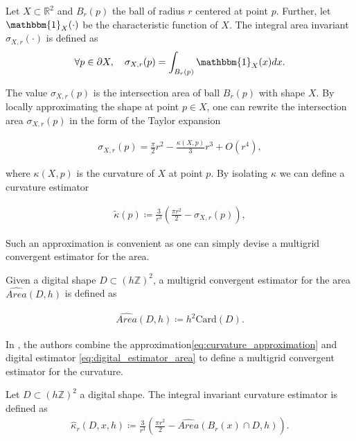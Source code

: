 \documentclass[runningheads]{llncs}
\begin{document}
\begin{definition}
  Let $X \subset \mathbb{R}^2$ and $B_r(p)$ the ball of radius $r$ centered at point $p$. Further, let
  $\mathbbm{1}_X(\cdot)$ be the characteristic function of $X$. The integral area invariant $\sigma_{X,r}(\cdot)$ is
  defined as
  \begin{align*}
    \forall p \in \partial X, \quad \sigma_{X,r}(p) = \int_{B_r(p)}{ \mathbbm{1}_X(x) dx}.
  \end{align*}
\end{definition}


The value $\sigma_{X,r}(p)$ is the intersection area of ball $B_r(p)$ with shape $X$. By locally approximating the shape
at point $p \in X$, one can rewrite the intersection area $\sigma_{X,r}(p)$ in the form of the Taylor expansion
\cite{pottman09intinvariant}
	
\begin{align*}
  \sigma_{X,r}(p) = \frac{\pi}{2}r^2 - \frac{\kappa(X,p)}{3}r^3 + O(r^4),
\end{align*}
		
where $\kappa(X,p)$ is the curvature of $X$ at point $p$. By isolating $\kappa$ we can define a curvature estimator
	
\begin{align}
  \tilde{\kappa}(p) \coloneqq \frac{3}{r^3}\left( \frac{\pi r^2}{2} - \sigma_{X,r}(p) \right),
  \label{eq:curvature_approximation}
\end{align}
	
Such an approximation is convenient as one can simply devise a multigrid convergent estimator for the area.

\begin{definition}	
  Given a digital shape $D \subset (h \mathbb{Z})^2$, a multigrid convergent estimator for the area $\widehat{Area}(D,h)$ is defined as	
		
  \begin{align}
    \widehat{Area}(D,h) \coloneqq h^2\text{Card}\left( D \right).	
    \label{eq:digital_estimator_area}
  \end{align}
\end{definition}
	
In \cite{coeurjolly13integral}, the authors combine the approximation\eqref{eq:curvature_approximation} and digital estimator
\eqref{eq:digital_estimator_area} to define a multigrid convergent estimator for the curvature.

\begin{definition}
  Let $D \subset (h \mathbb{Z})^2$ a digital shape. The integral invariant curvature estimator is defined as
  \begin{align*}
    \hat{\kappa}_{r}(D,x,h) \coloneqq \frac{3}{r^3} \left( \frac{\pi r^2}{2} - \widehat{Area} \left( B_{r} ( x ) \cap D, h \right) \right).
  \end{align*}
\end{definition}
\end{document}
